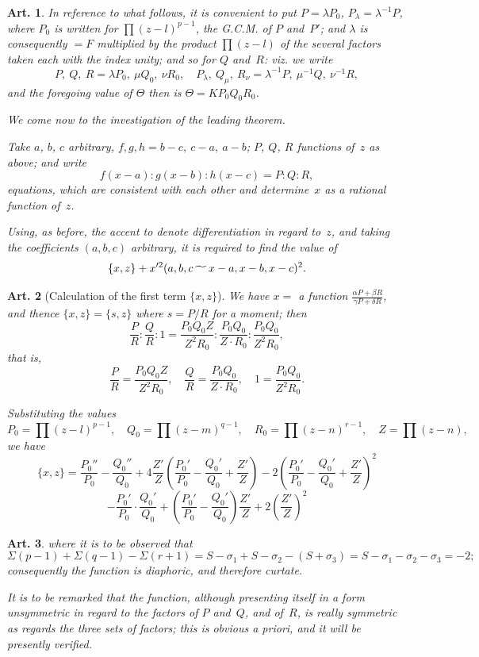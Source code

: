 \documentclass[11pt,a4paper]{article}
\theoremstyle{plain}
\newtheorem{art}{Art.}[section]
\begin{document}
\begin{art}
In reference to what follows, it is convenient to put $P = \lambda P_0$,
$P_\lambda = \lambda^{-1} P$, where $P_0$ is written for $\prod (z-l)^{p-1}$, the
G.C.M. of $P$ and~$P'$; and $\lambda$ is consequently $= F$ multiplied by the
product $\prod (z-l)$ of the several factors taken each with the index
unity; and so for $Q$ and~$R$:
viz. we write
\[
P,\ Q,\ R = \lambda P_0,\ \mu Q_0,\ \nu R_0, \quad
P_\lambda,\ Q_\mu,\ R_\nu = \lambda^{-1}P,\ \mu^{-1}Q,\ \nu^{-1}R,
\]
and the foregoing value of $\Theta$ then is $\Theta = K P_0 Q_0 R_0$.

We come now to the investigation of the leading theorem.

Take $a$, $b$, $c$ arbitrary, $f, g, h = b-c,\ c-a,\ a-b$; $P$, $Q$, $R$
functions of~$z$ as above; and write
\[
f(x-a) : g(x-b) : h(x-c) = P : Q : R,
\]
equations, which are consistent with each other and determine~$x$ as a
rational function of~$z$.

Using, as before, the accent to denote differentiation in regard to~$z$,
and taking the coefficients $(a, b, c)$ arbitrary, it is required to find the
value of
\[
\{x, z\} + x'^2 (a, b, c \,\raisebox{-.5ex}{$\widetilde{\phantom{aa}}$}\, x-a, x-b, x-c)^2.
\]
\end{art}

\begin{art}[Calculation of the first term $\{x, z\}$]
We have $x = $ a function $\frac{\alpha P + \beta R}{\gamma P + \delta R}$, and thence
$\{x, z\} = \{s, z\}$ where $s = P/R$ for a moment; then
\[
\frac{P}{R} : \frac{Q}{R} : 1 = \frac{P_0 Q_0 Z}{Z^2 R_0} : \frac{P_0 Q_0}{Z \cdot R_0} : \frac{P_0 Q_0}{Z^2 R_0},
\]
that is,
\[
\frac{P}{R} = \frac{P_0 Q_0 Z}{Z^2 R_0}, \quad
\frac{Q}{R} = \frac{P_0 Q_0}{Z \cdot R_0}, \quad
1 = \frac{P_0 Q_0}{Z^2 R_0}.
\]

Substituting the values
\[
P_0 = \prod (z-l)^{p-1}, \quad Q_0 = \prod (z-m)^{q-1}, \quad
R_0 = \prod (z-n)^{r-1}, \quad Z = \prod (z-n),
\]
we have
\[
\{x, z\} = \frac{P_0''}{P_0} - \frac{Q_0''}{Q_0} + 4\frac{Z'}{Z}
\left(\frac{P_0'}{P_0} - \frac{Q_0'}{Q_0} + \frac{Z'}{Z}\right)
- 2\left(\frac{P_0'}{P_0} - \frac{Q_0'}{Q_0} + \frac{Z'}{Z}\right)^2
\]
\[
- \frac{P_0'}{P_0} \cdot \frac{Q_0'}{Q_0}
+ \left(\frac{P_0'}{P_0} - \frac{Q_0'}{Q_0}\right) \frac{Z'}{Z}
+ 2\left(\frac{Z'}{Z}\right)^2
\]
\end{art}


\begin{art}
where it is to be observed that
\[
\Sigma(p-1) + \Sigma(q-1) - \Sigma(r+1)
= S - \sigma_1 + S - \sigma_2 - (S + \sigma_3) = S - \sigma_1 - \sigma_2 - \sigma_3 = -2;
\]
consequently the function is diaphoric, and therefore curtate.

It is to be remarked that the function, although presenting itself in a
form unsymmetric in regard to the factors of $P$ and~$Q$, and of~$R$,
is really symmetric as regards the three sets of factors; this is obvious
\textit{a priori}, and it will be presently verified.
\end{art}
\end{document}
